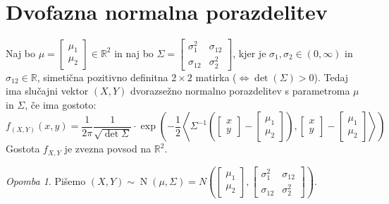 \documentclass[12pt]{book}
\theoremstyle{definition}
\theoremstyle{plain}
\theoremstyle{plain}
\theoremstyle{plain}
\theoremstyle{remark}
\newtheorem*{opomba}{Opomba}
\begin{document}
\section{Dvofazna normalna porazdelitev}

Naj bo $\mu=\begin{bmatrix}\mu_1 \\ \mu_2 \end{bmatrix} \in \mathbb{R}^2$ in naj bo $\Sigma=\begin{bmatrix} \sigma_1^2 & \sigma_{12} \\ \sigma_{12} & \sigma_2^2\end{bmatrix}$, kjer je $\sigma_1, \sigma_2 \in(0, \infty)$ in $\sigma_{12} \in \mathbb{R}$, simetična pozitivno definitna $2 \times 2$ matirka ($\iff \det (\Sigma) > 0$). Tedaj ima slučajni vektor $(X,Y)$ dvorazsežno normalno porazdelitev s parametroma $\mu$ in $\Sigma$, če ima gostoto: 
$$
f_{(X,Y)}(x, y)=\frac{1}{2 \pi} \frac{1}{\sqrt{\operatorname{det} \Sigma}} \cdot \exp \left(-\frac{1}{2}\left\langle\Sigma^{-1}\left(\begin{bmatrix} x \\ y \end{bmatrix}-\begin{bmatrix} \mu_1 \\ \mu_2 \end{bmatrix}\right),\begin{bmatrix} x \\ y \end{bmatrix}-\begin{bmatrix} \mu_1 \\ \mu_2 \end{bmatrix} \right\rangle \right)
$$
Gostota $f_{X,Y}$ je zvezna povsod na $\mathbb{R}^2$. 

\begin{opomba}
    Pišemo $(X, Y) \sim \operatorname{N}(\mu, \Sigma)=N\left(\begin{bmatrix} \mu_1 \\ \mu_2 \end{bmatrix},\begin{bmatrix} \sigma_1^2 & \sigma_{12} \\ \sigma_{12} & \sigma_2^2 \end{bmatrix}\right)$.
\end{opomba}
\end{document}
